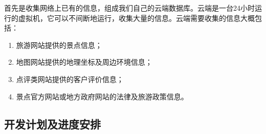 \documentclass[12pt,a4paper]{article}
\begin{document}
\begin{CJK}{UTF8}{gbsn}
	首先是收集网络上已有的信息，组成我们自己的云端数据库。云端是一台24小时运行的虚拟机，它可以不间断地运行，收集大量的信息。云端需要收集的信息大概包括：
	\begin{enumerate}
	\item	旅游网站提供的景点信息；
	\item	地图网站提供的地理坐标及周边环境信息；
	\item	点评类网站提供的客户评价信息；
	\item	景点官方网站或地方政府网站的法律及旅游政策信息。
	\end{enumerate}

	

	\subsection{开发计划及进度安排}



\end{CJK}
\end{document}
